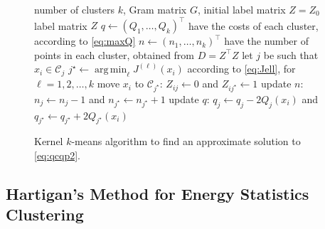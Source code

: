 \documentclass[aps,preprint,nofootinbib,floatfix]{revtex4-1}
\DeclareMathOperator*{\argmin}{arg\,min}
\newcommand\C{{\mathcal{C}}}
\begin{document}
\begin{figure}
\begin{algorithm}[H]
\vspace{.5em}
\begin{algorithmic}[1]
    \INPUT number of clusters $k$, Gram matrix $G$, initial label
    matrix $Z = Z_0$
    \OUTPUT label matrix $Z$ 
  \STATE $q \leftarrow (Q_1, \dotsc, Q_k)^\top$ 
            have the costs of each cluster, according to \eqref{eq:maxQ}
  \STATE $n \leftarrow (n_1,\dotsc,n_k)^\top$ 
        have the number of points in each cluster, obtained 
        from $D = Z^\top Z$
  \REPEAT
        \STATE let $j$ be such that $x_i \in \C_j$
        \STATE $j^\star \leftarrow \argmin_{\ell} J^{(\ell)}(x_i)$
            according to \eqref{eq:Jell}, for $\ell=1,2,\dots,k$
            \STATE move $x_i$ to $\C_{j^\star}$: $Z_{ij} \leftarrow 0$ and
            $Z_{ij^\star} \leftarrow 1$
            \STATE update $n$: $n_j \leftarrow n_j - 1$ and
                    $n_{j^\star} \leftarrow n_{j^\star} + 1$
            \STATE update $q$: $q_j \leftarrow q_j - 2Q_j(x_i)$ and
    $q_{j^\star} \leftarrow q_{j^\star} + 2Q_{j^\star}(x_i)$
        \ENDIF
    \ENDFOR
\end{algorithmic}
\caption{\label{kmeans_algo}
Kernel $k$-means algorithm 
to find an approximate solution to \eqref{eq:qcqp2}.
\hspace{\fill}
}
\end{algorithm}
\end{figure}


\subsection*{Hartigan's Method for Energy Statistics Clustering}
\end{document}
